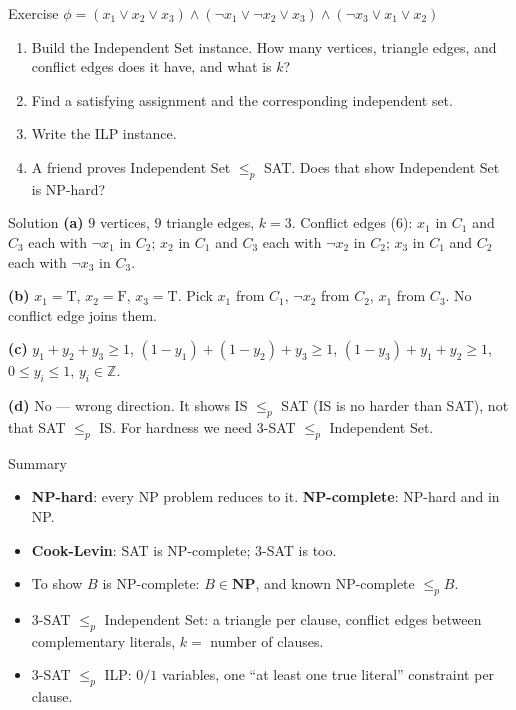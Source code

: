 \documentclass[10pt,aspectratio=169]{beamer}
\begin{document}
\begin{frame}{Exercise}
  $\phi = (x_1 \lor x_2 \lor x_3) \land (\neg x_1 \lor \neg x_2 \lor x_3)
         \land (\neg x_3 \lor x_1 \lor x_2)$

  \bigskip
  \begin{enumerate}
    \item Build the Independent Set instance. How many vertices, triangle
          edges, and conflict edges does it have, and what is $k$?
    \item Find a satisfying assignment and the corresponding independent
          set.
    \item Write the ILP instance.
    \item A friend proves Independent Set $\le_p$ SAT. Does that show
          Independent Set is NP-hard?
  \end{enumerate}
\end{frame}

\begin{frame}{Solution}
  \small
  \textbf{(a)} $9$ vertices, $9$ triangle edges, $k = 3$. Conflict edges
  ($6$): $x_1$ in $C_1$ and $C_3$ each with $\neg x_1$ in $C_2$; $x_2$ in
  $C_1$ and $C_3$ each with $\neg x_2$ in $C_2$; $x_3$ in $C_1$ and $C_2$
  each with $\neg x_3$ in $C_3$.

  \medskip
  \textbf{(b)} $x_1 = \mathrm{T}$, $x_2 = \mathrm{F}$, $x_3 = \mathrm{T}$.
  Pick $x_1$ from $C_1$, $\neg x_2$ from $C_2$, $x_1$ from $C_3$. No
  conflict edge joins them.

  \medskip
  \textbf{(c)}
  $y_1 + y_2 + y_3 \ge 1$, \quad $(1 - y_1) + (1 - y_2) + y_3 \ge 1$, \quad
  $(1 - y_3) + y_1 + y_2 \ge 1$, \quad $0 \le y_i \le 1$, $y_i \in
  \mathbb{Z}$.

  \medskip
  \textbf{(d)} No — wrong direction. It shows IS $\le_p$ SAT (IS is
  no harder than SAT), not that SAT $\le_p$ IS. For hardness we need
  3-SAT $\le_p$ Independent Set.
\end{frame}

\begin{frame}{Summary}
  \begin{itemize}
    \item \textbf{NP-hard}: every NP problem reduces to it.
          \textbf{NP-complete}: NP-hard and in NP.
    \item \textbf{Cook-Levin}: SAT is NP-complete; 3-SAT is too.
    \item To show $B$ is NP-complete: $B \in \mathbf{NP}$, and
          \alert{known NP-complete} $\le_p B$.
    \item 3-SAT $\le_p$ Independent Set: a triangle per clause, conflict
          edges between complementary literals, $k =$ number of clauses.
    \item 3-SAT $\le_p$ ILP: $0/1$ variables, one ``at least one true
          literal'' constraint per clause.
  \end{itemize}
\end{frame}
\end{document}
